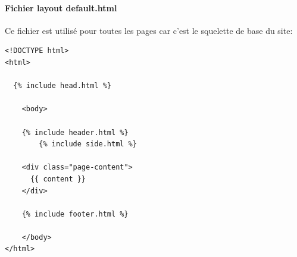 \documentclass[11pt,a4paper]{report}
\begin{document}
			\paragraph{Fichier layout default.html}Ce fichier est utilisé pour toutes les pages car c'est le squelette de base du site:
				\lstset{caption=Fichier "default.html", language=HTML}
				\begin{lstlisting}
<!DOCTYPE html>
<html>

  {% include head.html %}

    <body>

    {% include header.html %}
        {% include side.html %}

    <div class="page-content">
      {{ content }}
    </div>

    {% include footer.html %}

    </body>
</html>

				\end{lstlisting}
\end{document}
